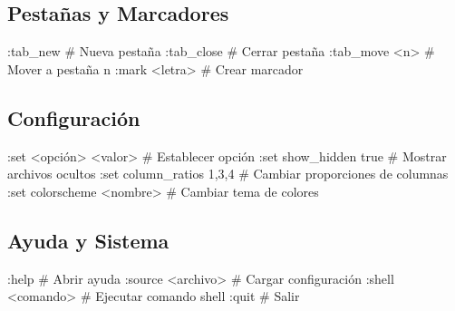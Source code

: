 \documentclass[
  doc,
  floatsintext,
  longtable,
  a4paper,
  nolmodern,
  notxfonts,
  notimes,
  12pt,
  colorlinks=true,linkcolor=blue,citecolor=blue,urlcolor=blue]{apa7}
\newenvironment{Shaded}{\begin{snugshade}}{\end{snugshade}}
\newcommand{\CommentTok}[1]{\textcolor[rgb]{0.37,0.37,0.37}{#1}}
\newcommand{\ExtensionTok}[1]{\textcolor[rgb]{0.00,0.23,0.31}{#1}}
\newcommand{\NormalTok}[1]{\textcolor[rgb]{0.00,0.23,0.31}{#1}}
\newcommand{\OperatorTok}[1]{\textcolor[rgb]{0.37,0.37,0.37}{#1}}
\begin{document}
\subsection{Pestañas y Marcadores}\label{pestauxf1as-y-marcadores}

\begin{Shaded}
\begin{Highlighting}[]
\ExtensionTok{:tab\_new}                   \CommentTok{\# Nueva pestaña}
\ExtensionTok{:tab\_close}                 \CommentTok{\# Cerrar pestaña}
\ExtensionTok{:tab\_move} \OperatorTok{\textless{}}\NormalTok{n}\OperatorTok{\textgreater{}}              \CommentTok{\# Mover a pestaña n}
\ExtensionTok{:mark} \OperatorTok{\textless{}}\NormalTok{letra}\OperatorTok{\textgreater{}}              \CommentTok{\# Crear marcador}
\end{Highlighting}
\end{Shaded}

\subsection{Configuración}\label{configuraciuxf3n}

\begin{Shaded}
\begin{Highlighting}[]
\ExtensionTok{:set} \OperatorTok{\textless{}}\NormalTok{opción}\OperatorTok{\textgreater{}} \OperatorTok{\textless{}}\NormalTok{valor}\OperatorTok{\textgreater{}}      \CommentTok{\# Establecer opción}
\ExtensionTok{:set}\NormalTok{ show\_hidden true      }\CommentTok{\# Mostrar archivos ocultos}
\ExtensionTok{:set}\NormalTok{ column\_ratios 1,3,4   }\CommentTok{\# Cambiar proporciones de columnas}
\ExtensionTok{:set}\NormalTok{ colorscheme }\OperatorTok{\textless{}}\NormalTok{nombre}\OperatorTok{\textgreater{}}  \CommentTok{\# Cambiar tema de colores}
\end{Highlighting}
\end{Shaded}

\subsection{Ayuda y Sistema}\label{ayuda-y-sistema}

\begin{Shaded}
\begin{Highlighting}[]
\ExtensionTok{:help}                      \CommentTok{\# Abrir ayuda}
\ExtensionTok{:source} \OperatorTok{\textless{}}\NormalTok{archivo}\OperatorTok{\textgreater{}}          \CommentTok{\# Cargar configuración}
\ExtensionTok{:shell} \OperatorTok{\textless{}}\NormalTok{comando}\OperatorTok{\textgreater{}}           \CommentTok{\# Ejecutar comando shell}
\ExtensionTok{:quit}                      \CommentTok{\# Salir}
\end{Highlighting}
\end{Shaded}
\end{document}
